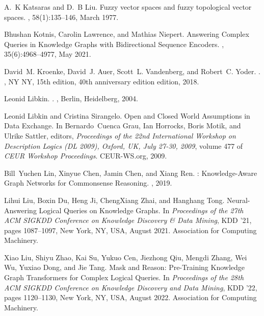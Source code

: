 \documentclass[11pt]{article}
\begin{document}
\begin{thebibliography}{10}
A.~K Katsaras and D.~B Liu.
\newblock Fuzzy vector spaces and fuzzy topological vector spaces.
,
  58(1):135--146, March 1977.

Bhushan Kotnis, Carolin Lawrence, and Mathias Niepert.
\newblock Answering {{Complex Queries}} in {{Knowledge Graphs}} with
  {{Bidirectional Sequence Encoders}}.
,
  35(6):4968--4977, May 2021.

David~M. Kroenke, David~J. Auer, Scott~L. Vandenberg, and Robert~C. Yoder.
.
, {NY NY}, 15th edition, 40th anniversary edition edition,
  2018.

Leonid Libkin.
.
, {Berlin, Heidelberg}, 2004.

Leonid Libkin and Cristina Sirangelo.
\newblock Open and {{Closed World Assumptions}} in {{Data Exchange}}.
\newblock In Bernardo~Cuenca Grau, Ian Horrocks, Boris Motik, and Ulrike
  Sattler, editors, {\em Proceedings of the 22nd {{International Workshop}} on
  {{Description Logics}} ({{DL}} 2009), {{Oxford}}, {{UK}}, {{July}} 27-30,
  2009}, volume 477 of {\em {{CEUR Workshop Proceedings}}}. {CEUR-WS.org},
  2009.

Bill~Yuchen Lin, Xinyue Chen, Jamin Chen, and Xiang Ren.
: {{Knowledge-Aware Graph Networks}} for {{Commonsense
  Reasoning}}.
, 2019.

Lihui Liu, Boxin Du, Heng Ji, ChengXiang Zhai, and Hanghang Tong.
\newblock Neural-{{Answering Logical Queries}} on {{Knowledge Graphs}}.
\newblock In {\em Proceedings of the 27th {{ACM SIGKDD Conference}} on
  {{Knowledge Discovery}} \& {{Data Mining}}}, {{KDD}} '21, pages 1087--1097,
  {New York, NY, USA}, August 2021. {Association for Computing Machinery}.

Xiao Liu, Shiyu Zhao, Kai Su, Yukuo Cen, Jiezhong Qiu, Mengdi Zhang, Wei Wu,
  Yuxiao Dong, and Jie Tang.
\newblock Mask and {{Reason}}: {{Pre-Training Knowledge Graph Transformers}}
  for {{Complex Logical Queries}}.
\newblock In {\em Proceedings of the 28th {{ACM SIGKDD Conference}} on
  {{Knowledge Discovery}} and {{Data Mining}}}, {{KDD}} '22, pages 1120--1130,
  {New York, NY, USA}, August 2022. {Association for Computing Machinery}.


\end{thebibliography}
\end{document}
